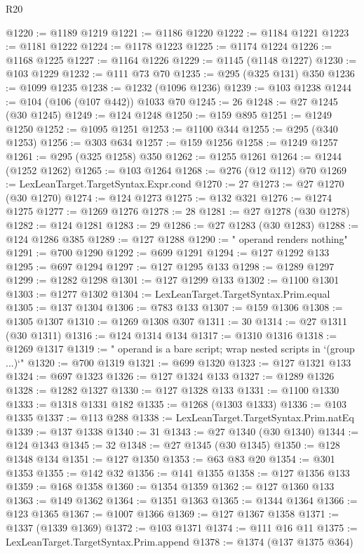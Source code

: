 \begin{lexlean}{R20}
\begin{coremodule}
{{{{{{{{{{{{{{{{{{{{{{{{{{{{{{{{{{{{{{{{{{{{{{{{{{{{{{{{{{{{{{{@1220 := @1189 @1219
@1221 := @1186 @1220
@1222 := @1184 @1221
@1223 := @1181 @1222
@1224 := @1178 @1223
@1225 := @1174 @1224
@1226 := @1168 @1225
@1227 := @1164 @1226
@1229 := @1145 (@1148 @1227)
@1230 := @103 @1229
@1232 := @111 @73 @70
@1235 := @295 (@325 @131) @350
@1236 := @1099 @1235
@1238 := @1232 (@1096 @1236)
@1239 := @103 @1238
@1244 := @104 (@106 (@107 @442)) @1033 @70
@1245 := 26
@1248 := @27 @1245 (@30 @1245)
@1249 := @124 @1248
@1250 := @159 @895
@1251 := @1249 @1250
@1252 := @1095 @1251
@1253 := @1100 @344
@1255 := @295 (@340 @1253)
@1256 := @303 @634
@1257 := @159 @1256
@1258 := @1249 @1257
@1261 := @295 (@325 @1258) @350
@1262 := @1255 @1261
@1264 := @1244 (@1252 @1262)
@1265 := @103 @1264
@1268 := @276 (@12 @112) @70
@1269 := LexLeanTarget.TargetSyntax.Expr.cond
@1270 := 27
@1273 := @27 @1270 (@30 @1270)
@1274 := @124 @1273
@1275 := @132 @321
@1276 := @1274 @1275
@1277 := @1269 @1276
@1278 := 28
@1281 := @27 @1278 (@30 @1278)
@1282 := @124 @1281
@1283 := 29
@1286 := @27 @1283 (@30 @1283)
@1288 := @124 @1286 @385
@1289 := @127 @1288
@1290 := " operand renders nothing"
@1291 := @700 @1290
@1292 := @699 @1291
@1294 := @127 @1292 @133
@1295 := @697 @1294
@1297 := @127 @1295 @133
@1298 := @1289 @1297
@1299 := @1282 @1298
@1301 := @127 @1299 @133
@1302 := @1100 @1301
@1303 := @1277 @1302
@1304 := LexLeanTarget.TargetSyntax.Prim.equal
@1305 := @137 @1304
@1306 := @783 @133
@1307 := @159 @1306
@1308 := @1305 @1307
@1310 := @1269 @1308 @307
@1311 := 30
@1314 := @27 @1311 (@30 @1311)
@1316 := @124 @1314 @134
@1317 := @1310 @1316
@1318 := @1269 @1317
@1319 := " operand is a bare script; wrap nested scripts in `(group ...)`"
@1320 := @700 @1319
@1321 := @699 @1320
@1323 := @127 @1321 @133
@1324 := @697 @1323
@1326 := @127 @1324 @133
@1327 := @1289 @1326
@1328 := @1282 @1327
@1330 := @127 @1328 @133
@1331 := @1100 @1330
@1333 := @1318 @1331 @182
@1335 := @1268 (@1303 @1333)
@1336 := @103 @1335
@1337 := @113 @288
@1338 := LexLeanTarget.TargetSyntax.Prim.natEq
@1339 := @137 @1338
@1340 := 31
@1343 := @27 @1340 (@30 @1340)
@1344 := @124 @1343
@1345 := 32
@1348 := @27 @1345 (@30 @1345)
@1350 := @128 @1348 @134
@1351 := @127 @1350
@1353 := @63 @83 @20
@1354 := @301 @1353
@1355 := @142 @32
@1356 := @141 @1355
@1358 := @127 @1356 @133
@1359 := @168 @1358
@1360 := @1354 @1359
@1362 := @127 @1360 @133
@1363 := @149 @1362
@1364 := @1351 @1363
@1365 := @1344 @1364
@1366 := @123 @1365
@1367 := @1007 @1366
@1369 := @127 @1367 @1358
@1371 := @1337 (@1339 @1369)
@1372 := @103 @1371
@1374 := @111 @16 @11
@1375 := LexLeanTarget.TargetSyntax.Prim.append
@1378 := @1374 (@137 @1375 @364)
}}}}}}}}}}}}}}}}}}}}}}}}}}}}}}}}}}}}}}}}}}}}}}}}}}}}}}}}}}}}}}}
\end{coremodule}
\end{lexlean}
